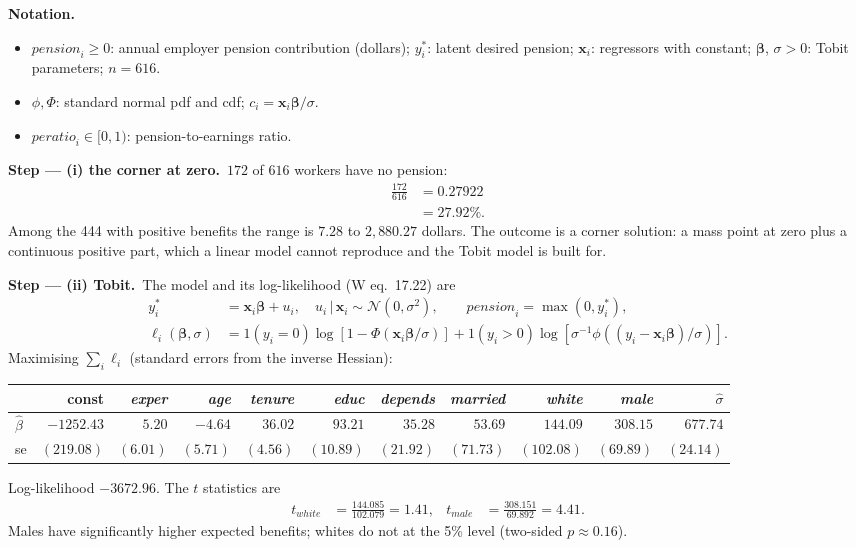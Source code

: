 \documentclass[11pt,a4paper]{article}
\numberwithin{equation}{questao}
\newenvironment{notacao}{\par\smallskip\noindent\textbf{Notation.}\begin{itemize}[leftmargin=1.4em,topsep=1pt,itemsep=0pt]\small}{\end{itemize}}
\newcommand{\passo}[2]{\par\smallskip\noindent\textbf{Step --- #1.}~#2}
\newcommand{\var}[1]{\mathit{#1}}
\newcommand{\N}{\mathcal{N}}
\begin{document}
\begin{sol}
\begin{notacao}
\item $\var{pension}_i\ge0$: annual employer pension contribution (dollars); $y_i^*$: latent desired pension; $\mathbf{x}_i$: regressors with constant; $\boldsymbol\beta$, $\sigma>0$: Tobit parameters; $n=616$.
\item $\phi,\Phi$: standard normal pdf and cdf; $c_i=\mathbf{x}_i\boldsymbol\beta/\sigma$.
\item $\var{peratio}_i\in[0,1)$: pension-to-earnings ratio.
\end{notacao}

\passo{(i) the corner at zero}{$172$ of $616$ workers have no pension:
\begin{align*}
\frac{172}{616}&=0.27922\\
&=27.92\% .
\end{align*}
Among the 444 with positive benefits the range is $7.28$ to $2{,}880.27$ dollars. The outcome is a corner
solution: a mass point at zero plus a continuous positive part, which a linear model cannot reproduce
and the Tobit model is built for.}

\passo{(ii) Tobit}{The model and its log-likelihood (W eq.~17.22) are
\begin{align}
y_i^*&=\mathbf{x}_i\boldsymbol\beta+u_i,\quad u_i\,|\,\mathbf{x}_i\sim\N(0,\sigma^2),\qquad \var{pension}_i=\max(0,y_i^*), \label{q5:tobit}\\
\ell_i(\boldsymbol\beta,\sigma)&=1(y_i=0)\log\left[1-\Phi(\mathbf{x}_i\boldsymbol\beta/\sigma)\right]+1(y_i>0)\log\left[\sigma^{-1}\phi\left((y_i-\mathbf{x}_i\boldsymbol\beta)/\sigma\right)\right]. \label{q5:ll}
\end{align}
Maximising $\sum_i\ell_i$ (standard errors from the inverse Hessian):
\begin{center}\small
\begin{tabular}{lrrrrrrrrrr}
\toprule
 & const & \textit{exper} & \textit{age} & \textit{tenure} & \textit{educ} & \textit{depends} & \textit{married} & \textit{white} & \textit{male} & $\hat\sigma$\\
\midrule
$\hat\beta$ & $-1252.43$ & $5.20$ & $-4.64$ & $36.02$ & $93.21$ & $35.28$ & $53.69$ & $144.09$ & $308.15$ & $677.74$\\
se & $(219.08)$ & $(6.01)$ & $(5.71)$ & $(4.56)$ & $(10.89)$ & $(21.92)$ & $(71.73)$ & $(102.08)$ & $(69.89)$ & $(24.14)$\\
\bottomrule
\end{tabular}
\end{center}
Log-likelihood $-3672.96$. The $t$ statistics are
\begin{align*}
t_{\var{white}}&=\frac{144.085}{102.079}=1.41, &
t_{\var{male}}&=\frac{308.151}{69.892}=4.41 .
\end{align*}
Males have significantly higher expected benefits; whites do not at the 5\% level (two-sided $p\approx0.16$).}


\end{sol}
\end{document}

